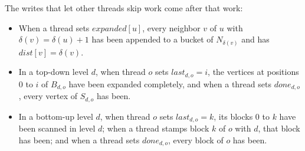 \begin{lemma}[Certificates]
\label{lem:certs}
The writes that let other threads skip work come after that work:
\begin{itemize}
    \item[(a)] When a thread sets $\mathit{expanded}[u]$, every neighbor $v$ of $u$ with $\delta(v) = \delta(u) + 1$ has been appended to a bucket of $N_{\delta(v)}$ and has $\mathit{dist}[v] = \delta(v)$.
    \item[(b)] In a top-down level $d$, when thread $o$ sets $\mathit{last}_{d,o} = i$, the vertices at positions $0$ to $i$ of $B_{d,o}$ have been expanded completely, and when a thread sets $\mathit{done}_{d,o}$, every vertex of $S_{d,o}$ has been.
    \item[(c)] In a bottom-up level $d$, when thread $o$ sets $\mathit{last}_{d,o} = k$, its blocks $0$ to $k$ have been scanned in level $d$; when a thread stamps block $k$ of $o$ with $d$, that block has been; and when a thread sets $\mathit{done}_{d,o}$, every block of $o$ has been.
\end{itemize}
\end{lemma}
